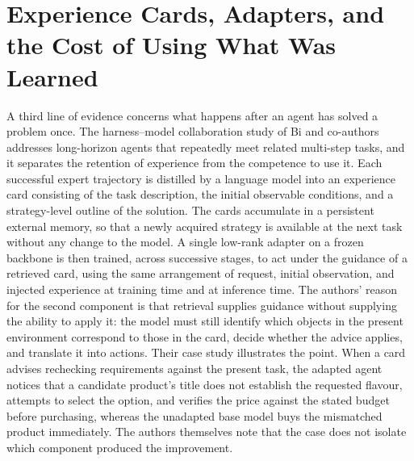 \documentclass[11pt]{article}
\theoremstyle{remark}
\begin{document}
\section{Experience Cards, Adapters, and the Cost of Using What Was Learned}\label{sec:hamo}

A third line of evidence concerns what happens after an agent has solved a problem once. The harness--model collaboration study of Bi and co-authors \cite{bi2026} addresses long-horizon agents that repeatedly meet related multi-step tasks, and it separates the retention of experience from the competence to use it. Each successful expert trajectory is distilled by a language model into an experience card consisting of the task description, the initial observable conditions, and a strategy-level outline of the solution. The cards accumulate in a persistent external memory, so that a newly acquired strategy is available at the next task without any change to the model. A single low-rank adapter on a frozen backbone is then trained, across successive stages, to act under the guidance of a retrieved card, using the same arrangement of request, initial observation, and injected experience at training time and at inference time. The authors' reason for the second component is that retrieval supplies guidance without supplying the ability to apply it: the model must still identify which objects in the present environment correspond to those in the card, decide whether the advice applies, and translate it into actions. Their case study illustrates the point. When a card advises rechecking requirements against the present task, the adapted agent notices that a candidate product's title does not establish the requested flavour, attempts to select the option, and verifies the price against the stated budget before purchasing, whereas the unadapted base model buys the mismatched product immediately. The authors themselves note that the case does not isolate which component produced the improvement.
\end{document}

